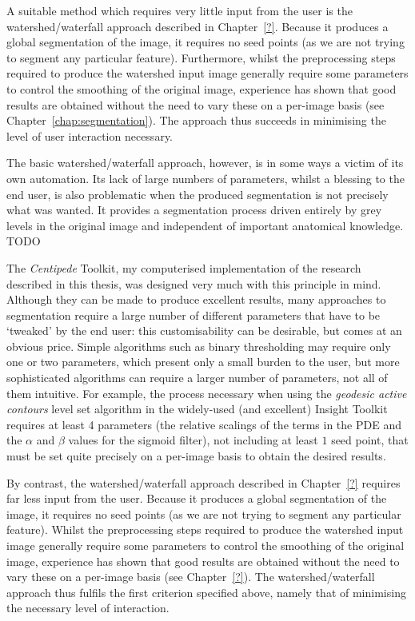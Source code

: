 A suitable method which requires very little input from the user is the watershed/waterfall approach \cite{?} described in Chapter~\ref{?}. Because it produces a global segmentation of the image, it requires no seed points (as we are not trying to segment any particular feature). Furthermore, whilst the preprocessing steps required to produce the watershed input image generally require some parameters to control the smoothing of the original image, experience has shown that good results are obtained without the need to vary these on a per-image basis (see Chapter~\ref{chap:segmentation}). The approach thus succeeds in minimising the level of user interaction necessary.

The basic watershed/waterfall approach, however, is in some ways a victim of its own automation. Its lack of large numbers of parameters, whilst a blessing to the end user, is also problematic when the produced segmentation is not precisely what was wanted. It provides a segmentation process driven entirely by grey levels in the original image and independent of important anatomical knowledge. TODO

\iffalse

The \emph{Centipede} Toolkit, my computerised implementation of the research described in this thesis, was designed very much with this principle in mind. Although they can be made to produce excellent results, many approaches to segmentation require a large number of different parameters that have to be `tweaked' by the end user: this customisability can be desirable, but comes at an obvious price. Simple algorithms such as binary thresholding may require only one or two parameters, which present only a small burden to the user, but more sophisticated algorithms can require a larger number of parameters, not all of them intuitive. For example, the process necessary when using the \emph{geodesic active contours} level set algorithm in the widely-used (and excellent) Insight Toolkit \cite{?} requires at least 4 parameters (the relative scalings of the terms in the PDE  and the $\alpha$ and $\beta$ values for the sigmoid filter), not including at least $1$ seed point, that must be set quite precisely on a per-image basis to obtain the desired results.

By contrast, the watershed/waterfall approach \cite{?} described in Chapter~\ref{?} requires far less input from the user. Because it produces a global segmentation of the image, it requires no seed points (as we are not trying to segment any particular feature). Whilst the preprocessing steps required to produce the watershed input image generally require some parameters to control the smoothing of the original image, experience has shown that good results are obtained without the need to vary these on a per-image basis (see Chapter~\ref{?}). The watershed/waterfall approach thus fulfils the first criterion specified above, namely that of minimising the necessary level of interaction.

